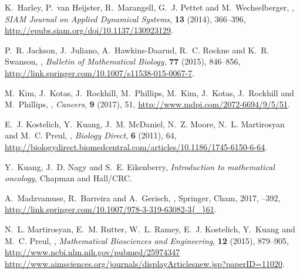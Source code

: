 \documentclass{aims}
\numberwithin{equation}{section}
\begin{document}
\begin{thebibliography}{10}
\newblock K.~Harley, P.~van Heijster, R.~Marangell, G.~J. Pettet and
  M.~Wechselberger,
,
\newblock \emph{SIAM Journal on Applied Dynamical Systems}, \textbf{13} (2014),
  366--396,
\newblock \urlprefix\url{http://epubs.siam.org/doi/10.1137/130923129}.

\newblock P.~R. Jackson, J.~Juliano, A.~Hawkins-Daarud, R.~C. Rockne and K.~R.
  Swanson,
,
\newblock \emph{Bulletin of Mathematical Biology}, \textbf{77} (2015),
  846--856,
\newblock \urlprefix\url{http://link.springer.com/10.1007/s11538-015-0067-7}.

\newblock M.~Kim, J.~Kotas, J.~Rockhill, M.~Phillips, M.~Kim, J.~Kotas,
  J.~Rockhill and M.~Phillips,
,
\newblock \emph{Cancers}, \textbf{9} (2017), 51,
\newblock \urlprefix\url{http://www.mdpi.com/2072-6694/9/5/51}.

\newblock E.~J. Kostelich, Y.~Kuang, J.~M. McDaniel, N.~Z. Moore, N.~L.
  Martirosyan and M.~C. Preul,
,
\newblock \emph{Biology Direct}, \textbf{6} (2011), 64,
\newblock
  \urlprefix\url{http://biologydirect.biomedcentral.com/articles/10.1186/1745-6150-6-64}.

\newblock Y.~Kuang, J.~D. Nagy and S.~E. Eikenberry,
\newblock \emph{{Introduction to mathematical oncology}},
\newblock Chapman and Hall/CRC.

\newblock A.~Madzvamuse, R.~Barreira and A.~Gerisch,
,
\newblock Springer, Cham, 2017,
--392,
\newblock
  \urlprefix\url{http://link.springer.com/10.1007/978-3-319-63082-3{\_}61}.

\newblock N.~L. Martirosyan, E.~M. Rutter, W.~L. Ramey, E.~J. Kostelich,
  Y.~Kuang and M.~C. Preul,
,
\newblock \emph{Mathematical Biosciences and Engineering}, \textbf{12} (2015),
  879--905,
\newblock \urlprefix\url{http://www.ncbi.nlm.nih.gov/pubmed/25974347
  http://www.aimsciences.org/journals/displayArticlesnew.jsp?paperID=11020}.


\end{thebibliography}
\end{document}
